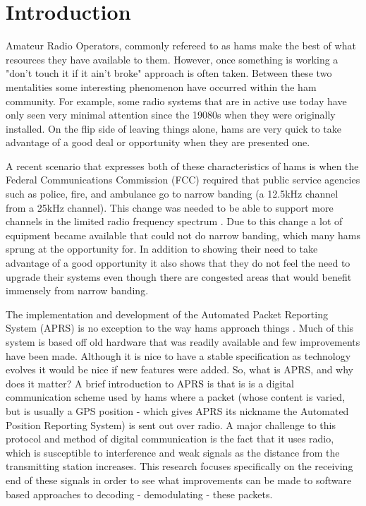 \chapter{Introduction}

Amateur Radio Operators, commonly refereed to as hams make the best of what resources they have available to them. However, once something is working a "don't touch it if it ain't broke" approach is often taken. Between these two mentalities some interesting phenomenon have occurred within the ham community. For example, some radio systems that are in active use today have only seen very minimal attention since the 19080s when they were originally installed. On the flip side of leaving things alone, hams are very quick to take advantage of a good deal or opportunity when they are presented one.

A recent scenario that expresses both of these characteristics of hams is when the Federal Communications Commission (FCC) required that public service agencies such as police, fire, and ambulance go to narrow banding (a 12.5kHz channel from a 25kHz channel). This change was needed to be able to support more channels in the limited radio frequency spectrum \cite{Commission2012}. Due to this change a lot of equipment became available that could not do narrow banding, which many hams sprung at the opportunity for. In addition to showing their need to take advantage of a good opportunity it also shows that they do not feel the need to upgrade their systems even though there are congested areas that would benefit immensely from narrow banding.

The implementation and development of the Automated Packet Reporting System (APRS) is no exception to the way hams approach things \cite{Bruninga}. Much of this system is based off old hardware that was readily available and few improvements have been made. Although it is nice to have a stable specification as technology evolves it would be nice if new features were added. So, what is APRS, and why does it matter? A brief introduction to APRS is that is is a digital communication scheme used by hams where a packet (whose content is varied, but is usually a GPS position - which gives APRS its nickname the Automated Position Reporting System) is sent out over radio. A major challenge to this protocol and method of digital communication is the fact that it uses radio, which is susceptible to interference and weak signals as the distance from the transmitting station increases. This research focuses specifically on the receiving end of these signals in order to see what improvements can be made to software based approaches to decoding - demodulating - these packets.

